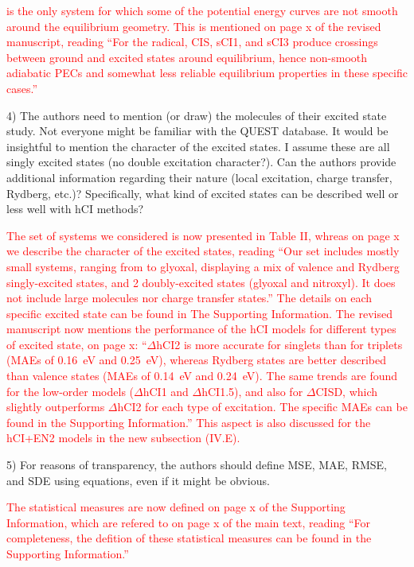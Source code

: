 \documentclass[10pt]{letter}
\newcommand{\alert}[1]{\textcolor{red}{#1}}
\begin{document}
\begin{letter}
\alert{
 is the only system for which some of the potential energy curves are not smooth around the equilibrium geometry.
This is mentioned on page x of the revised manuscript, reading
``For the \ce{CN} radical, CIS, sCI1, and sCI3 produce crossings between ground and excited states around equilibrium, hence non-smooth adiabatic PECs
and somewhat less reliable equilibrium properties in these specific cases.''
}

\clearpage

{4) The authors need to mention (or draw) the molecules of their excited state study. Not everyone might be familiar with the QUEST database. It would be insightful to mention the character of the excited states. I assume these are all singly excited states (no double excitation character?). Can the authors provide additional information regarding their nature (local excitation, charge transfer, Rydberg, etc.)? Specifically, what kind of excited states can be described well or less well with hCI methods?
}

\alert{
The set of systems we considered is now presented in Table II, whreas on page x we describe the character of the excited states, reading
``Our set includes mostly small systems, ranging from \ce{BH} to glyoxal, displaying a mix of valence and Rydberg singly-excited states,
and 2 doubly-excited states (glyoxal and nitroxyl). It does not include large molecules nor charge transfer states.''
The details on each specific excited state can be found in The Supporting Information.
The revised manuscript now mentions the performance of the hCI models for different types of excited state, on page x:
``$\Delta$hCI2 is more accurate for singlets than for triplets (MAEs of \SI{0.16}{\eV} and \SI{0.25}{\eV}),
whereas Rydberg states are better described than valence states (MAEs of \SI{0.14}{\eV} and \SI{0.24}{\eV}).
The same trends are found for the low-order models ($\Delta$hCI1 and $\Delta$hCI1.5), and also for $\Delta$CISD, which slightly outperforms $\Delta$hCI2 for each type of excitation.
The specific MAEs can be found in the Supporting Information.''
This aspect is also discussed for the hCI+EN2 models in the new subsection (IV.E).
}

{5) For reasons of transparency, the authors should define MSE, MAE, RMSE, and SDE using equations, even if it might be obvious.
}

\alert{
The statistical measures are now defined on page x of the Supporting Information, which are refered to on page x of the main text, reading
``For completeness, the defition of these statistical measures can be found in the Supporting Information.''
}


\end{letter}
\end{document}
